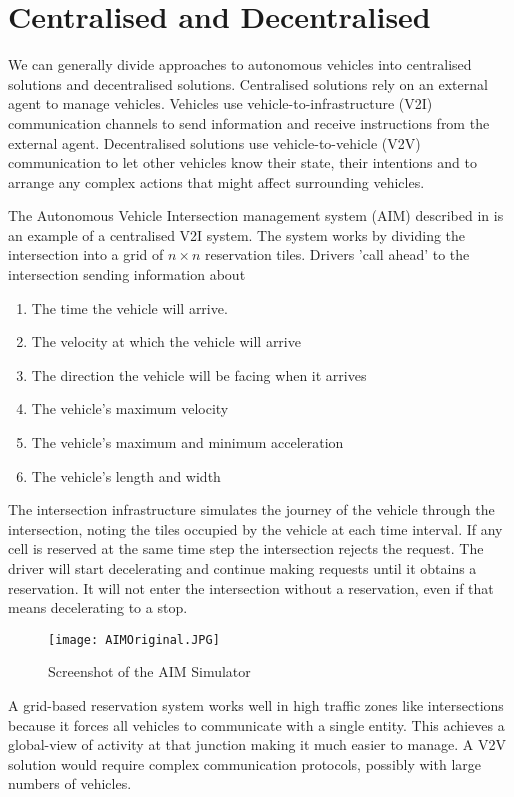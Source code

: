 \section{Centralised and Decentralised}
\label{sec:Centralised Systems}
We can generally divide approaches to autonomous vehicles into centralised solutions and decentralised solutions. Centralised solutions rely on an external agent to manage vehicles. Vehicles use vehicle-to-infrastructure (V2I) communication channels to send information and receive instructions from the external agent. Decentralised solutions use vehicle-to-vehicle (V2V) communication to let other vehicles know their state, their intentions and to arrange any complex actions that might affect surrounding vehicles.

The Autonomous Vehicle Intersection management system (AIM) described in \citep{Dresner2004} is an example of a centralised V2I system. The system works by dividing the intersection into a grid of $n \times n$ reservation tiles. Drivers 'call ahead' to the intersection sending information about

\begin{enumerate}
\item The time the vehicle will arrive.
\item The velocity at which the vehicle will arrive
\item The direction the vehicle will be facing when it arrives
\item The vehicle's maximum velocity
\item The vehicle's maximum and minimum acceleration
\item The vehicle's length and width
\end{enumerate}

The intersection infrastructure simulates the journey of the vehicle through the intersection, noting the tiles occupied by the vehicle at each time interval. If any cell is reserved at the same time step the intersection rejects the request. The driver will start decelerating and continue making requests until it obtains a reservation. It will not enter the intersection without a reservation, even if that means decelerating to a stop.

\begin{figure}[htb]
\texttt{[image: AIMOriginal.JPG]}
\caption{Screenshot of the AIM Simulator}
\end{figure}

A grid-based reservation system works well in high traffic zones like intersections because it forces all vehicles to communicate with a single entity. This achieves a global-view of activity at that junction making it much easier to manage. A V2V solution would require complex communication protocols, possibly with large numbers of vehicles.


